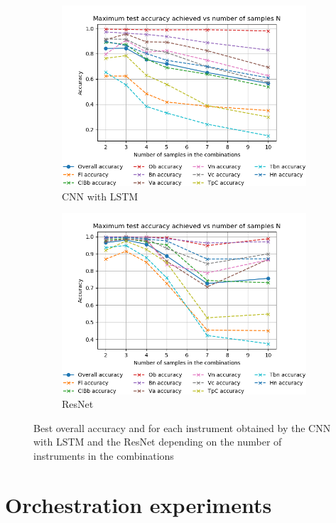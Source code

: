 \documentclass[runningheads,a4paper]{llncs}
\begin{document}
\begin{figure}
\centering
\begin{subfigure}{.65\textwidth}
  \centering
  \includegraphics[width=0.9\linewidth]{../latex/figs/Acc_vs_N_CNN.png}
  \caption{CNN with LSTM}
  \label{best_acc_cnn}
\end{subfigure}%
\begin{subfigure}{.65\textwidth}
  \centering
  \includegraphics[width=0.9\linewidth]{../latex/figs/Acc_vs_N_ResNet.png}
  \caption{ResNet}
  \label{best_acc_resnet}
\end{subfigure}
\caption{Best overall accuracy and for each instrument obtained by the CNN with LSTM and the ResNet depending on the number of instruments in the combinations}
\end{figure}


\section{Orchestration experiments}
\label{sec:orchestration}
\end{document}
